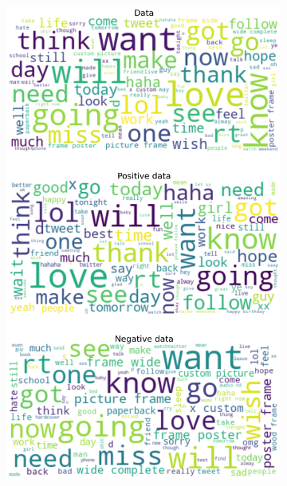 \documentclass{article}
\begin{document}
\begin{itemize}
\begin{figure}[H]
\begin{subfigure}[b]{0.24\textwidth}
      \includegraphics[width=\textwidth]{chapter-06/section-01-01/06/visualization/2/wordcloud.png}
    \end{subfigure}
    \begin{subfigure}[b]{0.24\textwidth}
      \centering

\end{subfigure}
\end{figure}
\end{itemize}
\end{document}
